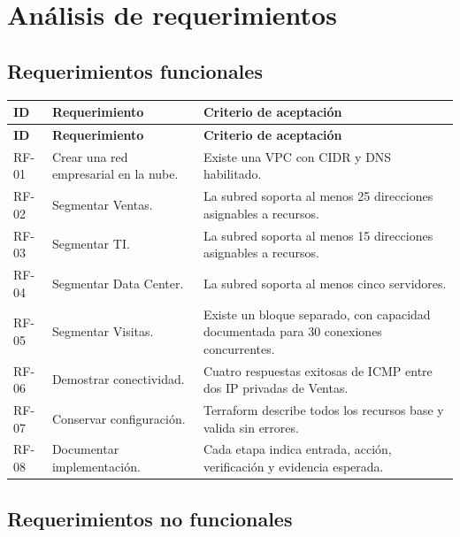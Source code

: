 \chapter{Análisis de requerimientos}

\section{Requerimientos funcionales}

\begin{longtable}{C{1.2cm}p{5.0cm}p{7.3cm}}
\toprule
\textbf{ID} & \textbf{Requerimiento} & \textbf{Criterio de aceptación} \\
\midrule
\endfirsthead
\toprule
\textbf{ID} & \textbf{Requerimiento} & \textbf{Criterio de aceptación} \\
\midrule
\endhead
RF-01 & Crear una red empresarial en la nube. & Existe una VPC con CIDR  y DNS habilitado. \\
RF-02 & Segmentar Ventas. & La subred soporta al menos 25 direcciones asignables a recursos. \\
RF-03 & Segmentar TI. & La subred soporta al menos 15 direcciones asignables a recursos. \\
RF-04 & Segmentar Data Center. & La subred soporta al menos cinco servidores. \\
RF-05 & Segmentar Visitas. & Existe un bloque separado, con capacidad documentada para 30 conexiones concurrentes. \\
RF-06 & Demostrar conectividad. & Cuatro respuestas exitosas de ICMP entre dos IP privadas de Ventas. \\
RF-07 & Conservar configuración. & Terraform describe todos los recursos base y valida sin errores. \\
RF-08 & Documentar implementación. & Cada etapa indica entrada, acción, verificación y evidencia esperada. \\
\bottomrule
\end{longtable}

\section{Requerimientos no funcionales}

